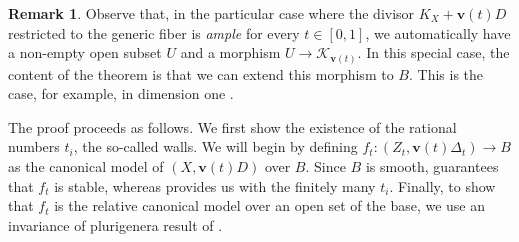 \documentclass[11pt]{amsart}
\theoremstyle{definition}
\newtheorem{remark}[theorem]{Remark}
\theoremstyle{remark}
\newcommand{\sK}{\mathscr{K}}
\begin{document}
	\begin{remark}
		Observe that, in the particular case where the divisor $K_X+\mathbf{v}(t)D$ restricted to the generic fiber is \emph{ample} for every $t \in [0,1]$, we automatically have a non-empty open subset $U$ and a morphism $U \to \sK_{\mathbf{v}(t)}$. In this special case, the content of the theorem is that we can extend this morphism to $B$. This is the case, for example, in dimension one \cite{Hassett}. 
	\end{remark}
	The proof proceeds as follows. We first show the existence of the rational numbers $t_i$, the so-called walls. We will begin by defining $f_t:(Z_t,\mathbf{v}(t)\Delta_t) \to B$ as the canonical model of $(X,\mathbf{v}(t)D)$ over $B$. Since $B$ is smooth, \cite[Theorem 4.54]{kollarmodulibook} guarantees that 
	$f_t$ is stable, whereas \cite{BCHM10} provides us with the finitely many $t_i$. Finally, to show that $f_t$ is the relative canonical model over an open set of the base, we use an invariance of plurigenera result of \cite[Section 4]{hacon2013birational}.
	
	
\end{document}
